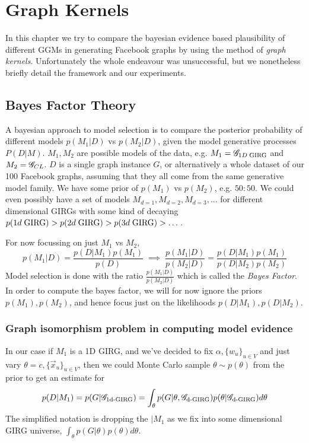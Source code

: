 \chapter{Graph Kernels}
\label{chap:graph_kernels}
\minitoc

In this chapter we try to compare the bayesian evidence based plausibility of different GGMs in generating Facebook graphs by using the method of \textit{graph kernels}. Unfortunately the whole endeavour was unsuccessful, but we nonetheless briefly detail the framework and our experiments.

\section{Bayes Factor Theory}
A bayesian approach to model selection is to compare the posterior probability of different models $p(M_1 | D)$ vs $p(M_2 | D)$, given the model generative processes $P(D | M)$. 
$M_1, M_2$ are possible models of the data, e.g. $M_1 = \mathscr{G}_{1D\; \mathrm{GIRG}}$ and $M_2 = \mathscr{G}_{CL}$.
$D$ is a single graph instance $G$, or alternatively a whole dataset of our 100 Facebook graphs, assuming that they all come from the same generative model family.
We have some prior of $p(M_1)$ vs $p(M_2)$, e.g. $50 : 50$. We could even possibly have a set of models $M_{d=1}, M_{d=2}, M_{d=3}, ...$ for different dimensional GIRGs with some kind of decaying $p(1d\; \mathrm{GIRG}) > p(2d\; \mathrm{GIRG}) > p(3d\; \mathrm{GIRG}) > \dots$.

For now focussing on just $M_1$ vs $M_2$,
\begin{equation}
  p(M_1 | D) = \frac{p(D | M_1) p(M_1)}{p(D)} 
  \;
  \implies
  \;
  \frac{p(M_1 | D)}{p(M_2 | D)} = \frac{p(D | M_1) p(M_1)}{p(D | M_2) p(M_2)}
\end{equation}
Model selection is done with the ratio $\frac{p(M_1 | D)}{p(M_2 | D)}$ which is called the \textit{Bayes Factor}.
In order to compute the bayes factor, we will for now ignore the priors $p(M_1), p(M_2)$, and hence focus just on the likelihoods $p(D | M_1), p(D | M_2)$.



\subsection{Graph isomorphism problem in computing model evidence}
In our case if $M_1$ is a 1D GIRG, and we've decided to fix 
$\alpha, \{w_u\}_{u \in V}$
 and just vary $\theta = c, \{\vec{x}_u\}_{u \in V}$, then we could Monte Carlo sample $\theta \sim p(\theta)$ from the prior to get an estimate for
\begin{equation} \label{eq:incorrect_girg_model_likelihood}
  p(D| M_1) = p(G | \mathscr{G}_{\text{1d-}\mathrm{GIRG}}) = \int_\theta p(G | \theta, \mathscr{G}_{\text{d-}\mathrm{GIRG}}) p(\theta | \mathscr{G}_{\text{d-}\mathrm{GIRG}}) d\theta
\end{equation}
The simplified notation is dropping the $| M_1$ as we fix into some dimensional GIRG universe, $\int_\theta p(G | \theta) p(\theta) d\theta$.

